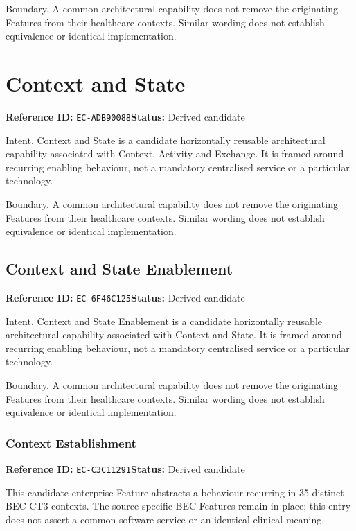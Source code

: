 \documentclass[11pt,a4paper,openany]{book}
\begin{document}
Boundary. A common architectural capability does not remove the originating Features from their healthcare contexts. Similar wording does not establish equivalence or identical implementation.

\section{Context and State}\label{cap:ec-adb90088}
\noindent\textbf{Reference ID:} \texttt{EC-ADB90088}\quad \textbf{Status:} Derived candidate\par
Intent. Context and State is a candidate horizontally reusable architectural capability associated with Context, Activity and Exchange. It is framed around recurring enabling behaviour, not a mandatory centralised service or a particular technology.

Boundary. A common architectural capability does not remove the originating Features from their healthcare contexts. Similar wording does not establish equivalence or identical implementation.

\subsection{Context and State Enablement}\label{cap:ec-6f46c125}
\noindent\textbf{Reference ID:} \texttt{EC-6F46C125}\quad \textbf{Status:} Derived candidate\par
Intent. Context and State Enablement is a candidate horizontally reusable architectural capability associated with Context and State. It is framed around recurring enabling behaviour, not a mandatory centralised service or a particular technology.

Boundary. A common architectural capability does not remove the originating Features from their healthcare contexts. Similar wording does not establish equivalence or identical implementation.

\subsubsection{Context Establishment}\label{cap:ec-c3c11291}
\noindent\textbf{Reference ID:} \texttt{EC-C3C11291}\quad \textbf{Status:} Derived candidate\par
This candidate enterprise Feature abstracts a behaviour recurring in 35 distinct BEC CT3 contexts. The source-specific BEC Features remain in place; this entry does not assert a common software service or an identical clinical meaning.
\end{document}

